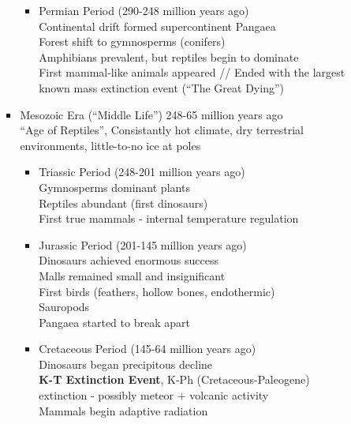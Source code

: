 \documentclass[12pt]{article}
\begin{document}
\begin{itemize}
\begin{itemize}
\begin{itemize}
\begin{itemize}
                    \item Permian Period (290-248 million years ago) \\
                    Continental drift formed supercontinent Pangaea \\
                    Forest shift to gymnosperms (conifers) \\
                    Amphibians prevalent, but reptiles begin to dominate \\
                    First mammal-like animals appeared //
                    Ended with the largest known mass extinction event (``The Great Dying'') \\  
                \end{itemize}
                \item Mesozoic Era (``Middle Life'') 248-65 million years ago \\
                ``Age of Reptiles'', Consistantly hot climate, dry terrestrial environments, little-to-no ice at poles
                \begin{itemize}
                    \item Triassic Period (248-201 million years ago) \\
                    Gymnosperms dominant plants \\
                    Reptiles abundant (first dinosaurs) \\
                    First true mammals - internal temperature regulation
                    \item Jurassic Period (201-145 million years ago) \\
                    Dinosaurs achieved enormous success \\
                    Malls remained small and insignificant \\
                    First birds (feathers, hollow bones, endothermic) \\
                    Sauropods \\
                    Pangaea started to break apart
                    \item Cretaceous Period (145-64 million years ago) \\
                    Dinosaurs began precipitous decline \\
                    \textbf{K-T Extinction Event}, K-Ph (Cretaceous-Paleogene) extinction - possibly meteor + volcanic activity \\
                    Mammals begin adaptive radiation \\

\end{itemize}
\end{itemize}
\end{itemize}
\end{itemize}
\end{document}
